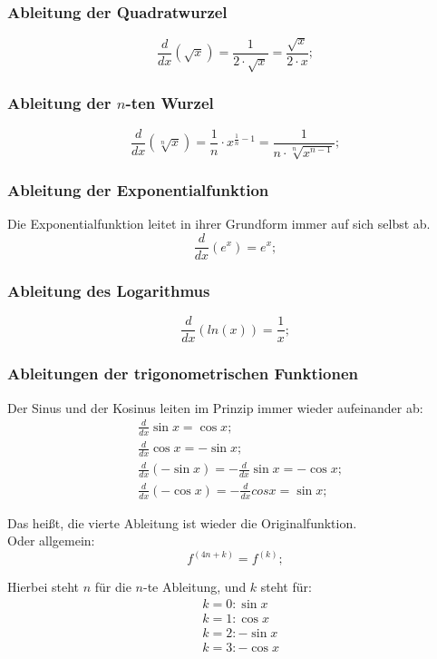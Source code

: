 \documentclass[a4paper]{article}
\begin{document}
\subsubsection{Ableitung der Quadratwurzel}
\[
	\frac{d}{dx} \left( \sqrt{x} \right) = \frac{1}{2 \cdot \sqrt{x}} = \frac{\sqrt{x}}{2 \cdot x} ;
\]

\subsubsection{Ableitung der $n$-ten Wurzel}
\[
	\frac{d}{dx} \left( \sqrt[n]{x} \right) = \frac{1}{n} \cdot x^{\frac{1}{n} - 1} = \frac{1}{n \cdot \sqrt[n]{x^{n - 1}}} ;
\]

\subsubsection{Ableitung der Exponentialfunktion}
Die Exponentialfunktion leitet in ihrer Grundform immer auf sich selbst ab.
\[
	\frac{d}{dx} \left( e^x \right) = e^x ;
\]

\subsubsection{Ableitung des Logarithmus}
\[
	\frac{d}{dx} \left( ln(x) \right) = \frac{1}{x} ;
\]

\subsubsection{Ableitungen der trigonometrischen Funktionen}
Der Sinus und der Kosinus leiten im Prinzip immer wieder aufeinander ab:
\begin{align*}
	& \frac{d}{dx} \sin{x} = \cos{x} ;
	\\
	& \frac{d}{dx} \cos{x} = -\sin{x} ;
	\\
	& \frac{d}{dx} \left( -\sin{x} \right) = -\frac{d}{dx} \sin{x} = -\cos{x} ;
	\\
	& \frac{d}{dx} \left( -\cos{x} \right) = -\frac{d}{dx} cos{x} = \sin{x} ;
\end{align*}

Das heißt, die vierte Ableitung ist wieder die Originalfunktion.\\
Oder allgemein:
\[
	f^{(4n + k)} = f^{(k)} ;
\]

Hierbei steht $n$ für die $n$-te Ableitung, und $k$ steht für:
\begin{align*}
	& k = 0: \sin{x}
	\\
	& k = 1: \cos{x}
	\\
	& k = 2: -\sin{x}
	\\
	& k = 3: -\cos{x}
\end{align*}
\end{document}
